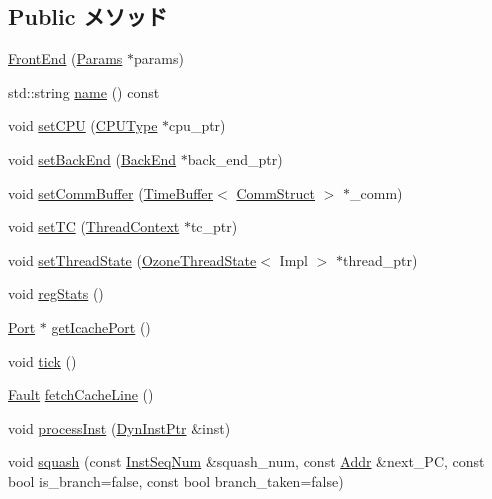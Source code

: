 \subsection*{Public メソッド}
\begin{DoxyCompactItemize}
\item 
\hyperlink{classFrontEnd_a207b33a1b071e34c89c0af0c3d4ae9ae}{FrontEnd} (\hyperlink{classFrontEnd_a818e103eae798a24a06a0a34631849ea}{Params} $\ast$params)
\item 
std::string \hyperlink{classFrontEnd_a37627d5d5bba7f4a8690c71c2ab3cb07}{name} () const 
\item 
void \hyperlink{classFrontEnd_a565fc31c4022b672a5c6b03a3dbcb408}{setCPU} (\hyperlink{classFrontEnd_ad0cc927c8534eaba1d99c29b2942311f}{CPUType} $\ast$cpu\_\-ptr)
\item 
void \hyperlink{classFrontEnd_a5f15ff995704fecfa4b6e5d6147ec622}{setBackEnd} (\hyperlink{classBackEnd}{BackEnd} $\ast$back\_\-end\_\-ptr)
\item 
void \hyperlink{classFrontEnd_aeabdb9f0aae07df67c3029f8fddb2693}{setCommBuffer} (\hyperlink{classTimeBuffer}{TimeBuffer}$<$ \hyperlink{classFrontEnd_ab99b68ad737741b1d3a073f2df88752a}{CommStruct} $>$ $\ast$\_\-comm)
\item 
void \hyperlink{classFrontEnd_ac6ccaaea6ac518cab92f71723b5a739e}{setTC} (\hyperlink{classThreadContext}{ThreadContext} $\ast$tc\_\-ptr)
\item 
void \hyperlink{classFrontEnd_a2a6551551e11d9e1947d6805e8322757}{setThreadState} (\hyperlink{structOzoneThreadState}{OzoneThreadState}$<$ Impl $>$ $\ast$thread\_\-ptr)
\item 
void \hyperlink{classFrontEnd_a4dc637449366fcdfc4e764cdf12d9b11}{regStats} ()
\item 
\hyperlink{classPort}{Port} $\ast$ \hyperlink{classFrontEnd_a530e48c3dbd3fa3fc72df27f49ed09a9}{getIcachePort} ()
\item 
void \hyperlink{classFrontEnd_a873dd91783f9efb4a590aded1f70d6b0}{tick} ()
\item 
\hyperlink{classRefCountingPtr}{Fault} \hyperlink{classFrontEnd_abc6f8ec144effb7168fdfdfc9661b884}{fetchCacheLine} ()
\item 
void \hyperlink{classFrontEnd_a91359adcd9112672ff9264d6428b4106}{processInst} (\hyperlink{classFrontEnd_a028ce10889c5f6450239d9e9a7347976}{DynInstPtr} \&inst)
\item 
void \hyperlink{classFrontEnd_a2b2ddbfb364763ee4f0f337c79d436d9}{squash} (const \hyperlink{inst__seq_8hh_a258d93d98edaedee089435c19ea2ea2e}{InstSeqNum} \&squash\_\-num, const \hyperlink{base_2types_8hh_af1bb03d6a4ee096394a6749f0a169232}{Addr} \&next\_\-PC, const bool is\_\-branch=false, const bool branch\_\-taken=false)

\end{DoxyCompactItemize}
